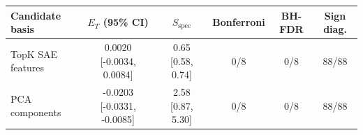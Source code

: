 \begin{tabular}{lccccc}
\toprule
Candidate basis & $E_T$ (95\% CI) & $S_{\mathrm{spec}}$ & Bonferroni & BH-FDR & Sign diag. \\
\midrule
TopK SAE features & 0.0020 [-0.0034, 0.0084] & 0.65 [0.58, 0.74] & 0/8 & 0/8 & 88/88 \\
PCA components & -0.0203 [-0.0331, -0.0085] & 2.58 [0.87, 5.30] & 0/8 & 0/8 & 88/88 \\
\bottomrule
\end{tabular}
